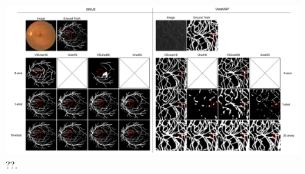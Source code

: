 \documentclass[%
reprint,
nofootinbib,
 amsmath,amssymb,
aps,
superscriptaddress,
showkeys,
longbibliography
]{revtex4-1}
\begin{document}
\begin{figure}[tbp]
    \centering
    \includegraphics[width=\textwidth]{figures/results/results_fewshots.pdf}
    \caption{??.}
    \label{f:results_fewshots_drive}
\end{figure}




\end{document}
